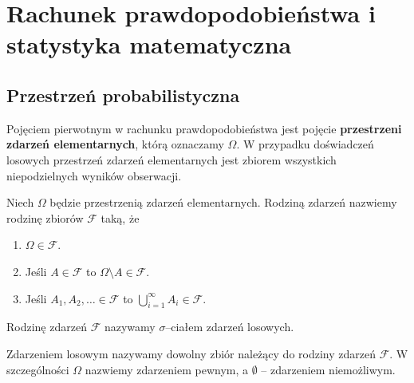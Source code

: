 \documentclass{myclass}
\numberwithin{equation}{section}
\begin{document}
\section{Rachunek prawdopodobieństwa i statystyka matematyczna}


\subsection{Przestrzeń probabilistyczna}

Pojęciem pierwotnym w rachunku prawdopodobieństwa jest pojęcie \textbf{przestrzeni zdarzeń
elementarnych}, którą oznaczamy \(\Omega\). W przypadku doświadczeń losowych przestrzeń zdarzeń
elementarnych jest zbiorem wszystkich niepodzielnych wyników obserwacji.

\begin{definition}

Niech \(\Omega\) będzie przestrzenią zdarzeń elementarnych. Rodziną zdarzeń nazwiemy rodzinę zbiorów
\(\mathcal{F}\) taką, że
\begin{enumerate}
    
    \item \(\Omega \in \mathcal{F}\).
    
    \item Jeśli \(A \in \mathcal{F}\) to \(\Omega \setminus A \in \mathcal{F}\).
    
    \item Jeśli \(A_1,A_2,\ldots \in \mathcal{F}\) to \(\bigcup_{i=1}^\infty A_i \in \mathcal{F}\).

\end{enumerate}

Rodzinę zdarzeń \(\mathcal{F}\) nazywamy \(\sigma\)--ciałem zdarzeń losowych.

\end{definition}

\begin{definition}
    Zdarzeniem losowym nazywamy dowolny zbiór należący do rodziny zdarzeń \(\mathcal{F}\). W
    szczególności \(\Omega\) nazwiemy zdarzeniem pewnym, a \(\emptyset\) -- zdarzeniem niemożliwym.
\end{definition}
\end{document}
